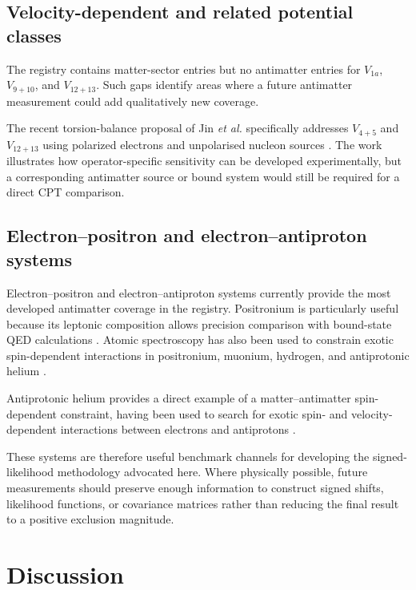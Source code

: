 \documentclass[aps,prd,reprint,superscriptaddress,nofootinbib]{revtex4-2}
\begin{document}
	\subsection{Velocity-dependent and related potential classes}
	
	The registry contains matter-sector entries but no antimatter entries
	for $V_{1a}$, $V_{9+10}$, and $V_{12+13}$. Such gaps identify areas
	where a future antimatter measurement could add qualitatively new
	coverage.
	
	The recent torsion-balance proposal of Jin \textit{et al.} specifically
	addresses $V_{4+5}$ and $V_{12+13}$ using polarized electrons and
	unpolarised nucleon sources \cite{Jin2026}. The work illustrates how
	operator-specific sensitivity can be developed experimentally, but a
	corresponding antimatter source or bound system would still be required
	for a direct CPT comparison.
	
	\subsection{Electron--positron and electron--antiproton systems}
	
	Electron--positron and electron--antiproton systems currently provide
	the most developed antimatter coverage in the registry. Positronium is
	particularly useful because its leptonic composition allows precision
	comparison with bound-state QED calculations \cite{Adkins2022}.
	Atomic spectroscopy has also been used to constrain exotic
	spin-dependent interactions in positronium, muonium, hydrogen, and
	antiprotonic helium \cite{Fadeev2022}.
	
	Antiprotonic helium provides a direct example of a matter--antimatter
	spin-dependent constraint, having been used to search for exotic
	spin- and velocity-dependent interactions between electrons and
	antiprotons \cite{Ficek2018}.
	
	These systems are therefore useful benchmark channels for developing
	the signed-likelihood methodology advocated here. Where physically
	possible, future measurements should preserve enough information to
	construct signed shifts, likelihood functions, or covariance matrices
	rather than reducing the final result to a positive exclusion magnitude.
	
	\section{Discussion}
	
\end{document}
